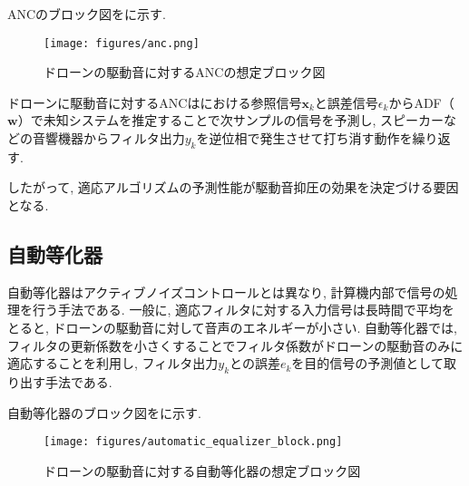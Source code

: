 ANCのブロック図をに示す. 

\begin{figure}[H]
\centering
\texttt{[image: figures/anc.png]}
\caption{ドローンの駆動音に対するANCの想定ブロック図}
\label{fig:anc_block}
\end{figure}

ドローンに駆動音に対するANCはにおける参照信号\(\bm{x}_k\)と誤差信号\(\epsilon_k\)からADF（\(\bm{w}\)）で未知システムを推定することで次サンプルの信号を予測し, スピーカーなどの音響機器からフィルタ出力\(y_k\)を逆位相で発生させて打ち消す動作を繰り返す. 

したがって, 適応アルゴリズムの予測性能が駆動音抑圧の効果を決定づける要因となる. 

\subsection{自動等化器}\label{automatic-equalizer}

自動等化器はアクティブノイズコントロールとは異なり, 計算機内部で信号の処理を行う手法である. 
一般に, 適応フィルタに対する入力信号は長時間で平均をとると, ドローンの駆動音に対して音声のエネルギーが小さい. 自動等化器では, フィルタの更新係数を小さくすることでフィルタ係数がドローンの駆動音のみに適応することを利用し, フィルタ出力\(y_k\)との誤差\(e_k\)を目的信号の予測値として取り出す手法である. 

自動等化器のブロック図をに示す. 

\begin{figure}[H]
\centering
\texttt{[image: figures/automatic\_equalizer\_block.png]}
\caption{ドローンの駆動音に対する自動等化器の想定ブロック図}
\label{equ:automatic_equlizer_block}
\end{figure}
